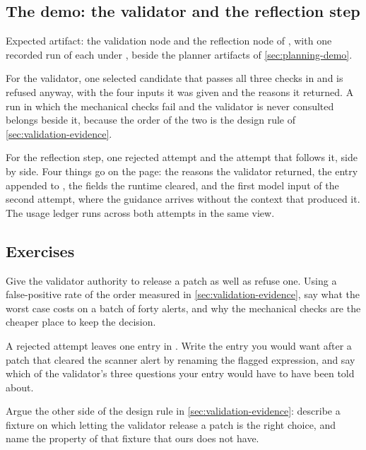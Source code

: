 \subsection{The demo: the validator and the reflection step}
\label{sec:validation-demo}

\begin{demostub}
Expected artifact: the validation node and the reflection node of
, with one recorded run of each under
, beside the planner artifacts of \cref{sec:planning-demo}.

For the validator, one selected candidate that passes all three checks in  and is
refused anyway, with the four inputs it was given and the reasons it returned. A run in which the
mechanical checks fail and the validator is never consulted belongs beside it, because the order of
the two is the design rule of \cref{sec:validation-evidence}.

For the reflection step, one rejected attempt and the attempt that follows it, side by side. Four
things go on the page: the reasons the validator returned, the entry appended to
, the fields the runtime cleared, and the first model input of the second
attempt, where the guidance arrives without the context that produced it. The usage ledger runs
across both attempts in the same view.
\end{demostub}

\subsection{Exercises}

\be

\item Give the validator authority to release a patch as well as refuse one. Using a false-positive
rate of the order measured in \cref{sec:validation-evidence}, say what the worst case costs on a
batch of forty alerts, and why the mechanical checks are the cheaper place to keep the decision.

\item A rejected attempt leaves one entry in . Write the entry you would want
after a patch that cleared the scanner alert by renaming the flagged expression, and say which of
the validator's three questions your entry would have to have been told about.

\item Argue the other side of the design rule in \cref{sec:validation-evidence}: describe a fixture
on which letting the validator release a patch is the right choice, and name the property of that
fixture that ours does not have.

